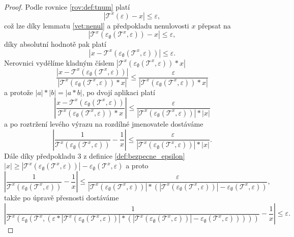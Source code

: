 \begin{theorem}
\begin{proof}
Podle rovnice \ref{rov:def:tnum} platí 
\begin{equation}
\left|\mathcal{T}^x(\varepsilon)-x\right|\leq \varepsilon,
\end{equation}
což lze díky lemmatu \ref{vet:nenul} a předpokladu nenulovosti $x$ přepsat na
\begin{equation}
\left|\mathcal{T}^x(\varepsilon_\emptyset(\mathcal{T}^x, \varepsilon))-x\right|\leq \varepsilon,
\end{equation}
díky absolutní hodnotě pak platí
\begin{equation}
\left| x-\mathcal{T}^x(\varepsilon_\emptyset(\mathcal{T}^x, \varepsilon))\right|\leq \varepsilon.
\end{equation}
Nerovnici vydělíme kladným číslem $|\mathcal{T}^x(\varepsilon_\emptyset(\mathcal{T}^x, \varepsilon))*x|$
\begin{equation}
\frac{\left| x-\mathcal{T}^x(\varepsilon_\emptyset(\mathcal{T}^x, \varepsilon))\right|}{|\mathcal{T}^x(\varepsilon_\emptyset(\mathcal{T}^x, \varepsilon))*x|}\leq \frac{\varepsilon}{|\mathcal{T}^x(\varepsilon_\emptyset(\mathcal{T}^x, \varepsilon))*x|}
\end{equation}
a protože $|a|*|b|=|a*b|$, po dvojí aplikaci platí
\begin{equation}
\left|\frac{ x-\mathcal{T}^x(\varepsilon_\emptyset(\mathcal{T}^x, \varepsilon))}{\mathcal{T}^x(\varepsilon_\emptyset(\mathcal{T}^x, \varepsilon))*x}\right|\leq \frac{\varepsilon}{|\mathcal{T}^x(\varepsilon_\emptyset(\mathcal{T}^x, \varepsilon))|*|x|}
\end{equation}
a po roztržení levého výrazu na rozdílné jmenovatele dostáváme
\begin{equation}
\left|\frac{1}{\mathcal{T}^x(\varepsilon_\emptyset(\mathcal{T}^x, \varepsilon))}-\frac{1}{x}\right|\leq \frac{\varepsilon}{|\mathcal{T}^x(\varepsilon_\emptyset(\mathcal{T}^x, \varepsilon))|*|x|}.
\end{equation}
Dále díky předpokladu $3$ z definice \ref{def:bezpecne_epsilon} $|x|\geq|\mathcal{T}^x(\varepsilon_\emptyset(\mathcal{T}^x, \varepsilon))|-\varepsilon_\emptyset(\mathcal{T}^x, \varepsilon)$ a proto
\begin{equation}
\left|\frac{1}{\mathcal{T}^x(\varepsilon_\emptyset(\mathcal{T}^x, \varepsilon))}-\frac{1}{x}\right|\leq \frac{\varepsilon}{|\mathcal{T}^x(\varepsilon_\emptyset(\mathcal{T}^x, \varepsilon))|*(|\mathcal{T}^x(\varepsilon_\emptyset(\mathcal{T}^x, \varepsilon))|-\varepsilon_\emptyset(\mathcal{T}^x, \varepsilon))},
\end{equation}
takže po úpravě přesnosti dostáváme
\begin{equation}
\left|\frac{1}{\mathcal{T}^x(\varepsilon_\emptyset(\mathcal{T}^x, (\varepsilon*|\mathcal{T}^x(\varepsilon_\emptyset(\mathcal{T}^x, \varepsilon))|*(|\mathcal{T}^x(\varepsilon_\emptyset(\mathcal{T}^x, \varepsilon))|-\varepsilon_\emptyset(\mathcal{T}^x, \varepsilon)))))}-\frac{1}{x}\right|\leq \varepsilon.
\end{equation}
\end{proof}
\end{theorem}

